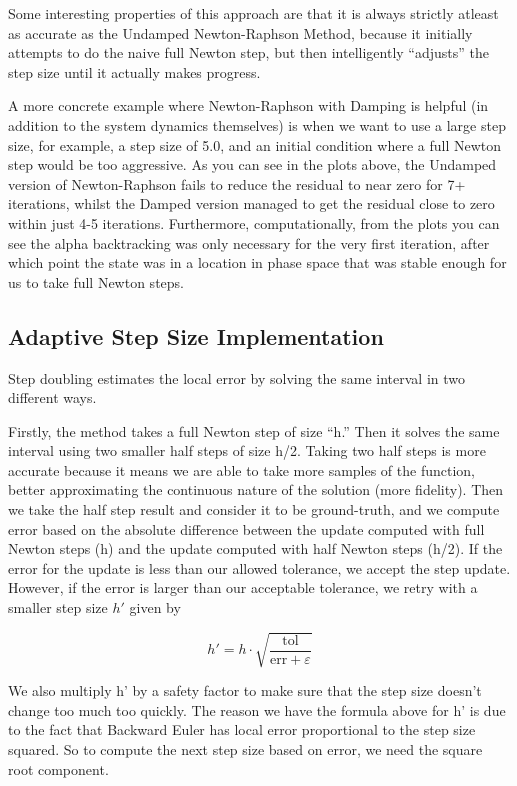 \documentclass[11pt]{article}
\begin{document}
Some interesting properties of this approach are that it is always
strictly atleast as accurate as the Undamped Newton-Raphson Method,
because it initially attempts to do the naive full Newton step, but then
intelligently ``adjusts'' the step size until it actually makes
progress.

A more concrete example where Newton-Raphson with Damping is helpful (in
addition to the system dynamics themselves) is when we want to use a
large step size, for example, a step size of 5.0, and an initial
condition where a full Newton step would be too aggressive. As you can
see in the plots above, the Undamped version of Newton-Raphson fails to
reduce the residual to near zero for 7+ iterations, whilst the Damped
version managed to get the residual close to zero within just 4-5
iterations. Furthermore, computationally, from the plots you can see the
alpha backtracking was only necessary for the very first iteration,
after which point the state was in a location in phase space that was
stable enough for us to take full Newton steps.

\subsection{Adaptive Step Size
Implementation}\label{adaptive-step-size-implementation}

Step doubling estimates the local error by solving the same interval in
two different ways.

Firstly, the method takes a full Newton step of size ``h.'' Then it
solves the same interval using two smaller half steps of size h/2.
Taking two half steps is more accurate because it means we are able to
take more samples of the function, better approximating the continuous
nature of the solution (more fidelity). Then we take the half step
result and consider it to be ground-truth, and we compute error based on
the absolute difference between the update computed with full Newton
steps (h) and the update computed with half Newton steps (h/2). If the
error for the update is less than our allowed tolerance, we accept the
step update. However, if the error is larger than our acceptable
tolerance, we retry with a smaller step size \(h'\) given by

\[h' = h \cdot \sqrt{\frac{\text{tol}}{\text{err} + \varepsilon}}\]

We also multiply h' by a safety factor to make sure that the step size
doesn't change too much too quickly. The reason we have the formula
above for h' is due to the fact that Backward Euler has local error
proportional to the step size squared. So to compute the next step size
based on error, we need the square root component.
\end{document}
